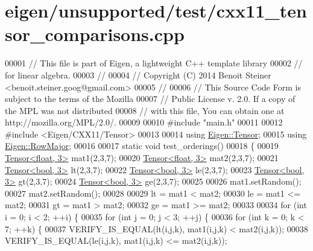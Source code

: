 \hypertarget{eigen_2unsupported_2test_2cxx11__tensor__comparisons_8cpp_source}{}\section{eigen/unsupported/test/cxx11\+\_\+tensor\+\_\+comparisons.cpp}
\label{eigen_2unsupported_2test_2cxx11__tensor__comparisons_8cpp_source}

\begin{DoxyCode}
00001 \textcolor{comment}{// This file is part of Eigen, a lightweight C++ template library}
00002 \textcolor{comment}{// for linear algebra.}
00003 \textcolor{comment}{//}
00004 \textcolor{comment}{// Copyright (C) 2014 Benoit Steiner <benoit.steiner.goog@gmail.com>}
00005 \textcolor{comment}{//}
00006 \textcolor{comment}{// This Source Code Form is subject to the terms of the Mozilla}
00007 \textcolor{comment}{// Public License v. 2.0. If a copy of the MPL was not distributed}
00008 \textcolor{comment}{// with this file, You can obtain one at http://mozilla.org/MPL/2.0/.}
00009 
00010 \textcolor{preprocessor}{#include "main.h"}
00011 
00012 \textcolor{preprocessor}{#include <Eigen/CXX11/Tensor>}
00013 
00014 \textcolor{keyword}{using} \hyperlink{class_eigen_1_1_tensor}{Eigen::Tensor};
00015 \textcolor{keyword}{using} \hyperlink{group__enums_ggaacded1a18ae58b0f554751f6cdf9eb13acfcde9cd8677c5f7caf6bd603666aae3}{Eigen::RowMajor};
00016 
00017 \textcolor{keyword}{static} \textcolor{keywordtype}{void} test\_orderings()
00018 \{
00019   \hyperlink{class_eigen_1_1_tensor}{Tensor<float, 3>} mat1(2,3,7);
00020   \hyperlink{class_eigen_1_1_tensor}{Tensor<float, 3>} mat2(2,3,7);
00021   \hyperlink{class_eigen_1_1_tensor}{Tensor<bool, 3>} lt(2,3,7);
00022   \hyperlink{class_eigen_1_1_tensor}{Tensor<bool, 3>} le(2,3,7);
00023   \hyperlink{class_eigen_1_1_tensor}{Tensor<bool, 3>} gt(2,3,7);
00024   \hyperlink{class_eigen_1_1_tensor}{Tensor<bool, 3>} ge(2,3,7);
00025 
00026   mat1.setRandom();
00027   mat2.setRandom();
00028 
00029   lt = mat1 < mat2;
00030   le = mat1 <= mat2;
00031   gt = mat1 > mat2;
00032   ge = mat1 >= mat2;
00033 
00034   \textcolor{keywordflow}{for} (\textcolor{keywordtype}{int} i = 0; i < 2; ++i) \{
00035     \textcolor{keywordflow}{for} (\textcolor{keywordtype}{int} j = 0; j < 3; ++j) \{
00036       \textcolor{keywordflow}{for} (\textcolor{keywordtype}{int} k = 0; k < 7; ++k) \{
00037         VERIFY\_IS\_EQUAL(lt(i,j,k), mat1(i,j,k) < mat2(i,j,k));
00038         VERIFY\_IS\_EQUAL(le(i,j,k), mat1(i,j,k) <= mat2(i,j,k));

\end{DoxyCode}
